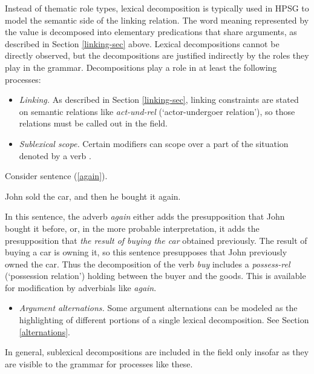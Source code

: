 \documentclass[output=paper
                ,modfonts
                ,nonflat
	        ,collection
	        ,collectionchapter
	        ,collectiontoclongg
 	        ,biblatex
                ,babelshorthands
                ,newtxmath
                ,draftmode
                ,colorlinks, citecolor=brown
]{./langsci/langscibook}
\begin{document}
Instead of thematic role types, lexical decomposition is typically used in HPSG to model the semantic side of the linking relation.  The word meaning represented by the \content value is decomposed into elementary predications that share arguments, as described in Section \ref{linking-sec} above.  Lexical decompositions cannot be directly observed, but the decompositions are justified indirectly by the roles they play in the grammar.  Decompositions play a role in at least the following processes:

\begin{itemize}
\item  \textit{Linking.}  As described in Section \ref{linking-sec}, linking constraints are stated on semantic relations like \textit{act-und-rel} (`actor-undergoer relation'), so those relations must be called out in the \content field.
\item \textit{Sublexical scope.}  Certain modifiers can scope over a part of the situation denoted by a verb \citep{Dowty:1979a}.  
\end{itemize}

Consider sentence (\ref{again}).

\begin{exe}
\ex \label{again} John sold the car, and then he bought it again.
\end{exe}

In this sentence, the adverb \textit{again} either adds the presupposition that John bought it before, or, in the more probable interpretation, it adds the presupposition that \textit{the result of buying the car} obtained previously.  The result of buying a car is owning it, so this sentence presupposes that John previously owned the car. Thus the decomposition of the verb \textit{buy} includes a \textit{possess-rel} (`possession relation') holding between the buyer and the goods.  This is available for modification by adverbials like \textit{again}.

\begin{itemize}
\item \textit{Argument alternations.}  Some argument alternations can be modeled as the highlighting of different portions of a single lexical decomposition.  See Section \ref{alternations}.  
\end{itemize}  

\noindent
In general, sublexical decompositions are included in the \content field only insofar as they are visible to the grammar for processes like these.  
\end{document}
